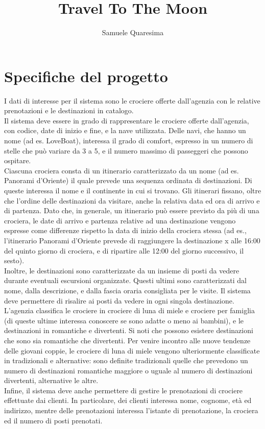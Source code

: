 \documentclass{article}
\title{Travel To The Moon}
\author{Samuele Quaresima}
\date{}
\begin{document}
\maketitle

\section{Specifiche del progetto}

I dati di interesse per il sistema sono le crociere offerte dall'agenzia con le relative prenotazioni e le destinazioni in catalogo.
\\
Il sistema deve essere in grado di rappresentare le crociere offerte dall'agenzia, con codice, date di inizio e fine, e la nave utilizzata. Delle navi, che hanno un nome (ad es. LoveBoat), interessa il grado di comfort, espresso in un numero di stelle che può variare da 3 a 5, e il numero massimo di passeggeri che possono ospitare.
\\
Ciascuna crociera consta di un itinerario caratterizzato da un nome (ad es. Panorami d'Oriente) il quale prevede una sequenza ordinata di destinazioni. Di queste interessa il nome e il continente in cui si trovano. Gli itinerari fissano, oltre che l'ordine delle destinazioni da visitare, anche la relativa data ed ora di arrivo e di partenza. Dato che, in generale, un itinerario può essere previsto da più di una crociera, le date di arrivo e partenza relative ad una destinazione vengono espresse come differenze rispetto la data di inizio della crociera stessa (ad es., l'itinerario Panorami d'Oriente prevede di raggiungere la destinazione x alle 16:00 del quinto giorno di crociera, e di ripartire alle 12:00 del giorno successivo, il sesto).
\\
Inoltre, le destinazioni sono caratterizzate da un insieme di posti da vedere durante eventuali escursioni organizzate. Questi ultimi sono caratterizzati dal nome, dalla descrizione, e dalla fascia oraria consigliata per le visite. Il sistema deve permettere di risalire ai posti da vedere in ogni singola destinazione.
\\
L'agenzia classifica le crociere in crociere di luna di miele e crociere per famiglia (di queste ultime interessa conoscere se sono adatte o meno ai bambini), e le destinazioni in romantiche e divertenti. Si noti che possono esistere destinazioni che sono sia romantiche che divertenti. Per venire incontro alle nuove tendenze delle giovani coppie, le crociere di luna di miele vengono ulteriormente classificate in tradizionali e alternative: sono definite tradizionali quelle che prevedono un numero di destinazioni romantiche maggiore o uguale al numero di destinazioni divertenti, alternative le altre.
\\
Infine, il sistema deve anche permettere di gestire le prenotazioni di crociere effettuate dai clienti. In particolare, dei clienti interessa nome, cognome, età ed indirizzo, mentre delle prenotazioni interessa l'istante di prenotazione, la crociera ed il numero di posti prenotati.
\\
\end{document}

